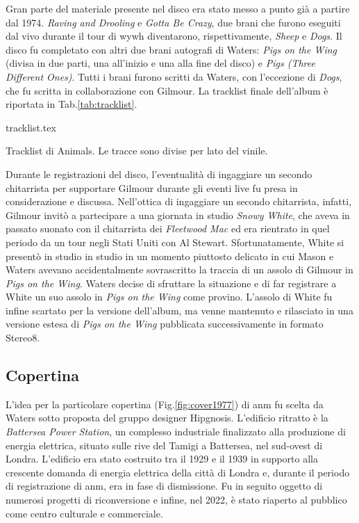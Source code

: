 \documentclass[class=book, crop=false, oneside, 12pt]{standalone}
\begin{document}
    Gran parte del materiale presente nel disco era stato messo a punto già a partire dal 1974.  \emph{Raving and Drooling} e \emph{Gotta Be Crazy}, due brani che furono eseguiti dal vivo durante il tour di \acrshort{wywh} diventarono, rispettivamente, \emph{Sheep} e \emph{Dogs}. Il disco fu completato con altri due brani autografi di Waters: \emph{Pigs on the Wing} (divisa in due parti, una all'inizio e una alla fine del disco) e \emph{Pigs (Three Different Ones)}. Tutti i brani furono scritti da Waters, con l'eccezione di \emph{Dogs}, che fu scritta in collaborazione con Gilmour. La tracklist finale dell'album è riportata in Tab.\ref{tab:tracklist}.

    \begin{table}[t]
        \centering
        {tracklist.tex}
        \caption{Tracklist di Animals. Le tracce sono divise per lato del vinile.}
        \label{tab:tracklist}
    \end{table}
    
    Durante le registrazioni del disco, l'eventualità di ingaggiare un secondo chitarrista per supportare Gilmour durante gli eventi live fu presa in considerazione e discussa. Nell'ottica di ingaggiare un secondo chitarrista, infatti, Gilmour invitò a partecipare a una giornata in studio \emph{Snowy White}, che aveva in passato suonato con il chitarrista dei \emph{Fleetwood Mac} ed era rientrato in quel periodo da un tour negli Stati Uniti con Al Stewart. Sfortunatamente, White si presentò in studio in studio in un momento piuttosto delicato in cui Mason e Waters avevano accidentalmente sovrascritto la traccia di un assolo di Gilmour in \emph{Pigs on the Wing}. Waters decise di sfruttare la situazione e di far registrare a White un suo assolo in \emph{Pigs on the Wing} come provino\cite{mason2017inside}. L'assolo di White fu infine scartato per la versione dell'album, ma venne mantenuto e rilasciato in una versione estesa di \emph{Pigs on the Wing} pubblicata successivamente in formato Stereo8.
    
    \subsection{Copertina}
    L'idea per la particolare copertina (Fig.\ref{fig:cover1977}) di \acrshort{anm} fu scelta da Waters sotto proposta del gruppo designer Hipgnosis\cite{pinkfloyd2022animalsdocumentary}. L'edificio ritratto è la \emph{Battersea Power Station}, un complesso industriale finalizzato alla produzione di energia elettrica, situato sulle rive del Tamigi a Battersea, nel sud-ovest di Londra. L'edificio era stato costruito tra il 1929 e il 1939 in supporto alla crescente domanda di energia elettrica della città di Londra e, durante il periodo di registrazione di \acrshort{anm}, era in fase di dismissione. Fu in seguito oggetto di numerosi progetti di riconversione e infine, nel 2022, è stato riaperto al pubblico come centro culturale e commerciale.
\end{document}
